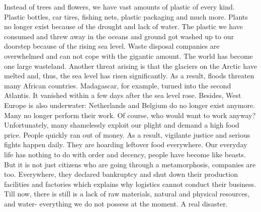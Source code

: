 \documentclass[]{book}
\begin{document}
Instead of trees and flowers, we have vast amounts of plastic of every kind. Plastic bottles, car tires, fishing nets, plastic packaging and much more. Plants no longer exist because of the drought and lack of water. The plastic we have consumed and threw away in the oceans and ground got washed up to our doorstep because of the rising sea level. Waste disposal companies are overwhelmed and can not cope with the gigantic amount. The world has become one large wasteland. Another threat arising is that the glaciers on the Arctic have melted and, thus, the sea level has risen significantly. As a result, floods threaten many African countries. Madagascar, for example, turned into the second Atlantis. It vanished within a few days after the sea level rose. Besides, West Europe is also underwater: Netherlands and Belgium do no longer exist anymore. Many no longer perform their work. Of course, who would want to work anyway? Unfortunately, many shamelessly exploit our plight and demand a high food price. People quickly ran out of money. As a result, vigilante justice and serious fights happen daily. They are hoarding leftover food everywhere. Our everyday life has nothing to do with order and decency, people have become like beasts. But it is not just citizens who are going through a metamorphosis, companies are too. Everywhere, they declared bankruptcy and shut down their production facilities and factories which explains why logistics cannot conduct their business. Till now, there is still is a lack of raw materials, natural and physical resources, and water- everything we do not possess at the moment. A real disaster.
\end{document}
